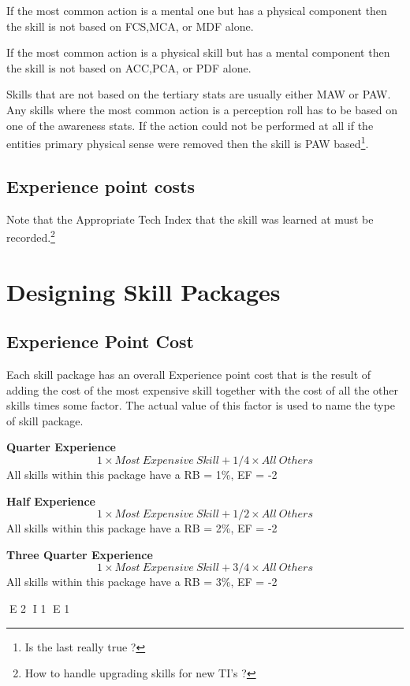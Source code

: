 If the most common action is a mental one but has a physical component then
the skill is not based on FCS,MCA, or MDF alone.

If the most common action is a physical skill but has a mental component then the
skill is not based on ACC,PCA, or PDF alone.

Skills that are not based on the tertiary stats are usually either MAW
or PAW. Any skills where the most common action is a perception roll has
to be based on one of the awareness stats. If the action could not be
performed at all if the entities primary physical sense were removed
then the skill is PAW based\footnote{Is the last really true ?}.

\subsection{Experience point costs}

Note that the Appropriate Tech Index that the skill was learned at
must be recorded.\footnote{ How to handle upgrading skills for new TI's ?}

\section{Designing Skill Packages}

\subsection{Experience Point Cost}

Each skill package has an overall Experience point cost that is
the result of adding the cost of the most expensive skill together
with the cost of all the other skills times some factor. The actual value
of this factor is used to name the type of skill package.

{\bf Quarter Experience}
\[ 1 \times Most\ Expensive\ Skill + 1/4 \times All\ Others \]
All skills within this package have a RB = 1\%, EF = -2

{\bf Half Experience }
\[ 1 \times Most\ Expensive\ Skill + 1/2 \times All\ Others \]
All skills within this package have a RB = 2\%, EF = -2

{\bf Three Quarter Experience}
\[ 1 \times Most\ Expensive\ Skill + 3/4 \times All\ Others \]
All skills within this package have a RB = 3\%, EF = -2


E 2
I 1
E 1
